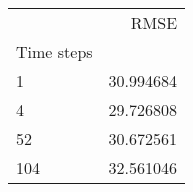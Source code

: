 \begin{tabular}{lr}
 & RMSE \\
Time steps &  \\
1 & 30.994684 \\
4 & 29.726808 \\
52 & 30.672561 \\
104 & 32.561046 \\
\end{tabular}
